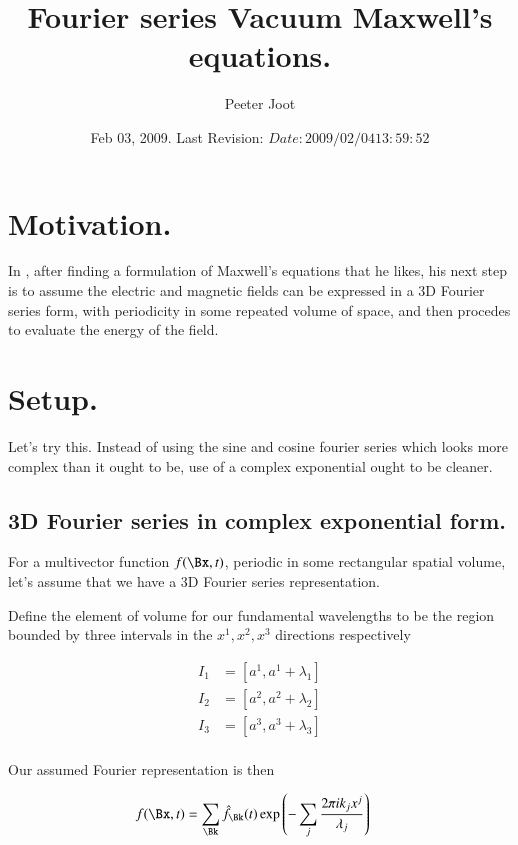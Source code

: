 \documentclass{article}
\title{ Fourier series Vacuum Maxwell's equations. }
\author{Peeter Joot}
\date{ Feb 03, 2009.  Last Revision: $Date: 2009/02/04 13:59:52 $ }
\begin{document}
\maketitle{}

\tableofcontents

\section{ Motivation. }

In \cite{bohm1989qt}, 
after finding a formulation of Maxwell's equations that he likes, his next
step is to assume the electric and magnetic fields can be expressed in 
a 3D Fourier series form, with periodicity in some repeated volume 
of space, and then procedes to evaluate the energy of the 
field.

\section{ Setup. }

Let's try this.  Instead of using the sine and cosine fourier series
which looks more complex than it ought to be, use of a complex exponential
ought to be cleaner.

\subsection{ 3D Fourier series in complex exponential form. }

For a multivector function $f(\Bx, t)$, periodic in some rectangular spatial volume, let's assume that we have a
3D Fourier series representation.

Define the element of volume for our fundamental wavelengths to be the region bounded by three intervals in the $x^1, x^2, x^3$ directions respectively

\begin{align*}
I_1 &= [ a^1, a^1 + \lambda_1 ] \\
I_2 &= [ a^2, a^2 + \lambda_2 ] \\
I_3 &= [ a^3, a^3 + \lambda_3 ] \\
\end{align*}

Our assumed Fourier representation is then

\begin{align*}
f(\Bx, t) &= \sum_{\Bk} \hat{f}_{\Bk}(t) \exp\left( - \sum_j \frac{2 \pi i k_j x^j}{\lambda_j} \right)
\end{align*}
\end{document}

